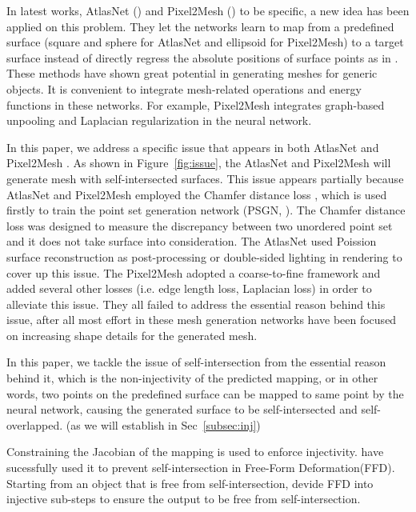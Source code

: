 In latest works, AtlasNet (\cite{atlasnet}) and Pixel2Mesh (\cite{pixel2mesh}) to be specific, a new idea has been applied on this problem. They let the networks learn to map from a predefined surface (square and sphere for AtlasNet and ellipsoid for Pixel2Mesh) to a target surface instead of directly regress the absolute positions of surface points as in \cite{PSGN}. These methods have shown great potential in generating meshes for generic objects. It is convenient to integrate mesh-related operations and energy functions in these networks. For example, Pixel2Mesh integrates graph-based unpooling and Laplacian regularization in the neural network. 

In this paper, we address a specific issue that appears in both AtlasNet \cite{atlasnet} and Pixel2Mesh \cite{pixel2mesh}. As shown in Figure~\ref{fig:issue}, the AtlasNet and Pixel2Mesh will generate mesh with self-intersected surfaces. This issue appears partially because AtlasNet and Pixel2Mesh employed the Chamfer distance loss , which is used firstly to train the point set generation network (PSGN, \cite{PSGN}). The Chamfer distance loss was designed to measure the discrepancy between two unordered point set and it does not take surface into consideration. The AtlasNet used Poission surface reconstruction as post-processing or double-sided lighting in rendering to cover up this issue. The Pixel2Mesh adopted a coarse-to-fine framework and added several other losses (i.e. edge length loss, Laplacian loss) in order to alleviate this issue. They all failed to address the essential reason behind this issue, after all most effort in these mesh generation networks have been focused on increasing shape details for the generated mesh.

In this paper, we tackle the issue of self-intersection from the essential reason behind it, which is the non-injectivity of the predicted mapping, or in other words, two points on the predefined surface can be mapped to same point by the neural network, causing the generated surface to be self-intersected and self-overlapped. (as we will establish in Sec~\ref{subsec:inj})

Constraining the Jacobian of the mapping is used to enforce injectivity. \cite{tvcgprevent} have sucessfully used it to prevent self-intersection in Free-Form Deformation(FFD). Starting from an object that is free from self-intersection, \cite{tvcgprevent} devide FFD into injective sub-steps to ensure the output to be free from self-intersection.

